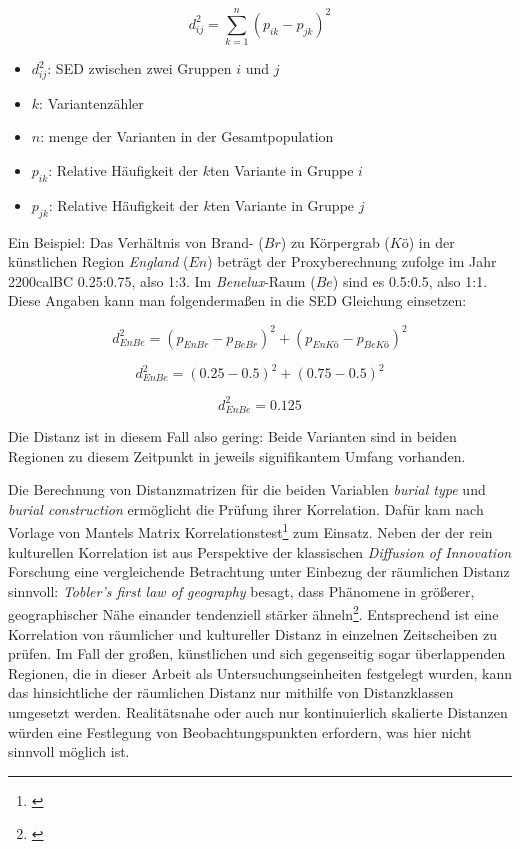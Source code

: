 \documentclass[openany,twoside,twocolumn]{book}
\providecommand{\tightlist}{%
  \setlength{\itemsep}{0pt}\setlength{\parskip}{0pt}}
\let\rmarkdownfootnote\footnote%
\def\footnote{\protect\rmarkdownfootnote}
\begin{document}
\[d_{ij}^2 = \sum_{k = 1}^{n} (p_{ik} - p_{jk})^2\]

\begin{itemize}
\tightlist
\item
  \(d_{ij}^2\): SED zwischen zwei Gruppen \(i\) und \(j\)
\item
  \(k\): Variantenzähler
\item
  \(n\): menge der Varianten in der Gesamtpopulation
\item
  \(p_{ik}\): Relative Häufigkeit der \(k\)ten Variante in Gruppe \(i\)
\item
  \(p_{jk}\): Relative Häufigkeit der \(k\)ten Variante in Gruppe \(j\)
\end{itemize}

Ein Beispiel: Das Verhältnis von Brand- (\(Br\)) zu Körpergrab (\(Kö\))
in der künstlichen Region \emph{England} (\(En\)) beträgt der
Proxyberechnung zufolge im Jahr 2200calBC 0.25:0.75, also 1:3. Im
\emph{Benelux}-Raum (\(Be\)) sind es 0.5:0.5, also 1:1. Diese Angaben
kann man folgendermaßen in die SED Gleichung einsetzen:

\[d_{En Be}^2 = (p_{En Br} - p_{Be Br})^2 + (p_{En Kö} - p_{Be Kö})^2\]

\[d_{En Be}^2 = (0.25 - 0.5)^2 + (0.75 - 0.5)^2\]

\[d_{En Be}^2 = 0.125\]

Die Distanz ist in diesem Fall also gering: Beide Varianten sind in
beiden Regionen zu diesem Zeitpunkt in jeweils signifikantem Umfang
vorhanden.

Die Berechnung von Distanzmatrizen für die beiden Variablen \emph{burial
type} und \emph{burial construction} ermöglicht die Prüfung ihrer
Korrelation. Dafür kam nach Vorlage von
\textcite{porcic_simulating_2014} Mantels Matrix
Korrelationstest\footnote{\textcite{mantel_detection_1967}} zum Einsatz.
Neben der der rein kulturellen Korrelation ist aus Perspektive der
klassischen \emph{Diffusion of Innovation} Forschung eine vergleichende
Betrachtung unter Einbezug der räumlichen Distanz sinnvoll:
\emph{Tobler's first law of geography} besagt, dass Phänomene in
größerer, geographischer Nähe einander tendenziell stärker
ähneln\footnote{\textcite{tobler_computer_1970}}. Entsprechend ist eine
Korrelation von räumlicher und kultureller Distanz in einzelnen
Zeitscheiben zu prüfen. Im Fall der großen, künstlichen und sich
gegenseitig sogar überlappenden Regionen, die in dieser Arbeit als
Untersuchungseinheiten festgelegt wurden, kann das hinsichtliche der
räumlichen Distanz nur mithilfe von Distanzklassen umgesetzt werden.
Realitätsnahe oder auch nur kontinuierlich skalierte Distanzen würden
eine Festlegung von Beobachtungspunkten erfordern, was hier nicht
sinnvoll möglich ist.
\end{document}

